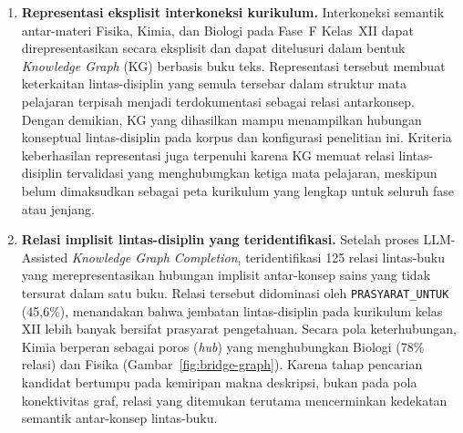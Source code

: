 \documentclass[../../thesis]{subfiles}
\begin{document}
\begin{enumerate}
  \item \textbf{Representasi eksplisit interkoneksi kurikulum.}
        Interkoneksi semantik antar-materi Fisika, Kimia, dan Biologi pada
        Fase~F Kelas~XII dapat direpresentasikan secara eksplisit dan dapat
        ditelusuri dalam bentuk \textit{Knowledge Graph} (KG) berbasis buku teks.
        Representasi tersebut membuat keterkaitan lintas-disiplin yang semula
        tersebar dalam struktur mata pelajaran terpisah menjadi terdokumentasi
        sebagai relasi antarkonsep. Dengan demikian, KG yang dihasilkan mampu
        menampilkan hubungan konseptual lintas-disiplin pada korpus dan
        konfigurasi penelitian ini. Kriteria keberhasilan representasi juga
        terpenuhi karena KG memuat relasi lintas-disiplin tervalidasi yang
        menghubungkan ketiga mata pelajaran, meskipun belum dimaksudkan sebagai
        peta kurikulum yang lengkap untuk seluruh fase atau jenjang.

  \item \textbf{Relasi implisit lintas-disiplin yang teridentifikasi.}
        Setelah proses LLM-Assisted \textit{Knowledge Graph Completion},
        teridentifikasi 125 relasi lintas-buku yang merepresentasikan hubungan
        implisit antar-konsep sains yang tidak tersurat dalam satu buku. Relasi tersebut didominasi
        oleh \texttt{PRASYARAT\_UNTUK} (45{,}6\%), menandakan bahwa jembatan
        lintas-disiplin pada kurikulum kelas XII lebih banyak bersifat prasyarat
        pengetahuan. Secara pola keterhubungan, Kimia berperan sebagai poros
        (\textit{hub}) yang menghubungkan Biologi (78\% relasi) dan Fisika
        (Gambar~\ref{fig:bridge-graph}). Karena tahap pencarian kandidat
        bertumpu pada kemiripan makna deskripsi, bukan pada pola konektivitas
        graf, relasi yang ditemukan terutama mencerminkan kedekatan semantik
        antar-konsep lintas-buku.


\end{enumerate}
\end{document}
